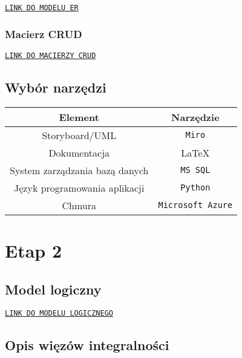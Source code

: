\documentclass[10pt]{article}
\begin{document}
\noindent\texttt{\href{https://miro.com/app/board/o9J_lL9uIOo=/}{LINK DO MODELU ER}}

\subsubsection{Macierz CRUD}

\noindent\texttt{\href{https://wutwaw-my.sharepoint.com/:x:/g/personal/01143627_pw_edu_pl/EWBP5IBfqCFLiPvmQnpEDcAB0eGgw4UuIhm6bPNvxlSkyA?e=69XRhd}{LINK DO MACIERZY CRUD}}

\subsection{Wybór narzędzi}
\begin{table}[!h]
    \begin{center}
        \begin{tabular}{c|c}
            \textbf{Element} & \textbf{Narzędzie} \\
            \hline
            Storyboard/UML & \texttt{Miro} \\
            Dokumentacja & \LaTeX{} \\
            System zarządzania bazą danych & \texttt{MS SQL} \\
            Język programowania aplikacji & \texttt{Python} \\
            Chmura & \texttt{Microsoft Azure}
        \end{tabular}
    \end{center}
\end{table}

\pagebreak %

\section{Etap 2}

\subsection{Model logiczny}

\noindent \texttt{\href{https://github.com/JMazurkiewicz/BD2-Catering/blob/modeling/docs/logical-model.pdf}{LINK DO MODELU LOGICZNEGO}}

\subsection{Opis więzów integralności}
\end{document}
